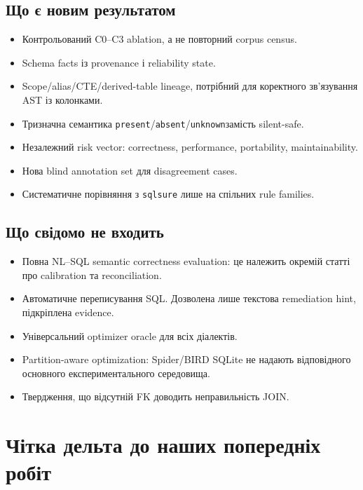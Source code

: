 \documentclass[11pt,a4paper]{article}
\newcommand{\unknown}{\texttt{unknown}}
\newcommand{\presentstate}{\texttt{present}}
\newcommand{\absentstate}{\texttt{absent}}
\begin{document}
\subsection{Що є новим результатом}

\begin{itemize}
\item Контрольований C0--C3 ablation, а не повторний corpus census.
\item Schema facts із provenance і reliability state.
\item Scope/alias/CTE/derived-table lineage, потрібний для коректного зв'язування AST
      із колонками.
\item Тризначна семантика \presentstate/\absentstate/\unknown замість silent-safe.
\item Незалежний risk vector: correctness, performance, portability, maintainability.
\item Нова blind annotation set для disagreement cases.
\item Систематичне порівняння з \texttt{sqlsure} лише на спільних rule families.
\end{itemize}

\subsection{Що свідомо не входить}

\begin{itemize}
\item Повна NL--SQL semantic correctness evaluation: це належить окремій статті
      про calibration та reconciliation.
\item Автоматичне переписування SQL. Дозволена лише текстова remediation hint,
      підкріплена evidence.
\item Універсальний optimizer oracle для всіх діалектів.
\item Partition-aware optimization: Spider/BIRD SQLite не надають відповідного
      основного експериментального середовища.
\item Твердження, що відсутній FK доводить неправильність JOIN.
\end{itemize}

\section{Чітка дельта до наших попередніх робіт}
\end{document}

